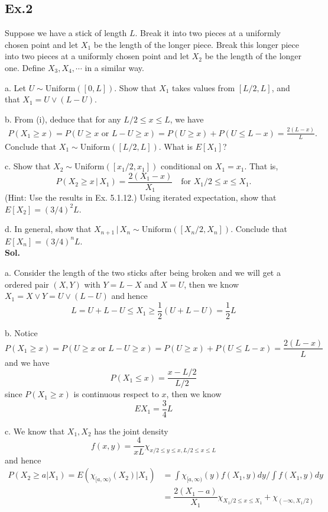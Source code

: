 \documentclass[lang=en,11pt,a4paper,citestyle =authoryear]{elegantpaper}
\begin{document}
\subsection*{Ex.2} 
Suppose we have a stick of length $L$. Break it into two pieces at a
uniformly chosen point and let $X_{1}$ be the length of the longer piece. Break
this longer piece into two pieces at a uniformly chosen point and let $X_{2}$ be
the length of the longer one. Define $X_{3},X_{4},\cdots$ in a similar way.\par
a. Let $U\sim \text{Uniform}([0,L])$. Show that $X_{1}$ takes values from $[L/2,L]$, and that $X_{1} = U\vee (L-U)$.\par
b. From (i), deduce that for any $L/2 \le x \le L$, we have
\begin{align}
P(X_{1}\geq x) = P(\text{$U\geq x$ or $L-U\geq x$}) = P(U\geq x) +
P(U\leq L-x) = \frac{2(L-x)}{L}.
\end{align}
Conclude that $X_{1}\sim \text{Uniform}([L/2,L])$. What is $E[X_{1}]$?\par
c. Show that $X_{2}\sim \text{Uniform}([x_{1}/2, x_{1}])$
conditional on $X_{1}=x_{1}$. That is,
\[
P(X_{2}\geq x \,|\, X_{1}) = \frac{2(X_{1}-x)}{X_{1}} \quad \text{for $X_{1}/2 \leq x \leq X_{1}$}.
\]
({Hint:} Use the results in Ex. 5.1.12.) Using iterated
expectation, show that $E[X_{2}] = (3/4)^{2}L$.\par
d. In general, show that $X_{n+1}\,|\, X_{n} \sim \text{Uniform}([X_{n}/2, X_{n}])$. Conclude that $E[X_{n}]= (3/4)^{n}L$.
\vspace{0.5em}\\
\textbf{Sol.} \par
a. Consider the length of the two sticks after being broken and we will get a ordered pair $(X,Y)$ with $Y = L-X$ and $X = U$, then we know $X_1 = X\vee Y = U\vee(L-U)$ and hence
\[L = U+L-U\leq X_1 \geq \dfrac{1}{2}(U+L-U) = \dfrac{1}{2} L\]\par
b. Notice
\[P(X_{1}\geq x) = P(\text{$U\geq x$ or $L-U\geq x$}) = P(U\geq x) +
P(U\leq L-x) = \frac{2(L-x)}{L}\]
and we have
\[P(X_{1} \leq x) = \dfrac{x-L/2}{L/2}\]
since $P(X_{1} \geq x)$ is continuous respect to $x$, then we know
\[EX_1 = \dfrac{3}{4}L\]\par
c. We know that $X_1,X_2$ has the joint density
\[f(x,y) = \dfrac{4}{xL}\chi_{x/2\leq y \leq x, L/2\leq x \leq L}\]
and hence
\[
\begin{aligned}
P(X_2 \geq a|X_1) = E(\chi_{[a,\infty)}(X_2)|X_1) &= \int \chi_{[a,\infty)}(y)f(X_1,y)dy / \int f(X_1,y) dy \\ &= \dfrac{2(X_1-a)}{X_1}\chi_{X_1/2\leq x\leq X_1} + \chi_{(-\infty,X_1/2)}
\end{aligned}\]\par
\end{document}

